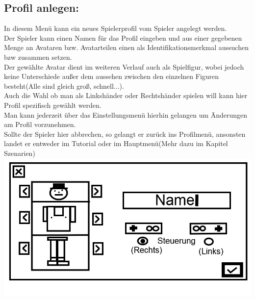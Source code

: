 \documentclass{scrartcl}
\begin{document}
\begin{enumerate}
	\begin{minipage}{1\textwidth}
		\item \subsection*{Profil anlegen:}
		In diesem Menü kann ein neues Spielerprofil vom Spieler angelegt werden.\\
		Der Spieler kann einen Namen für das Profil eingeben und aus einer gegebenen Menge an Avataren bzw. Avatarteilen einen als Identifikationsmerkmal aussuchen bzw zusammen setzen.\\
		Der gewählte Avatar dient im weiteren Verlauf auch als Spielfigur, wobei jedoch keine Unterschiede außer dem aussehen zwischen den einzelnen Figuren besteht(Alle sind gleich groß, schnell...).\\
		Auch die Wahl ob man als Linkshänder oder Rechtshänder spielen will kann hier Profil spezifisch gewählt werden.\\
		Man kann jederzeit über das Einstellungsmenü hierhin gelangen um Änderungen am Profil vorzunehmen.\\
		Sollte der Spieler hier abbrechen, so gelangt er zurück ins Profilmenü, ansonsten landet er entweder im Tutorial oder im Hauptmenü(Mehr dazu im Kapitel Szenarien)\\
		\includegraphics[width=\textwidth]{assets/CreateProfile2}
	\end{minipage}
	

\end{enumerate}
\end{document}
